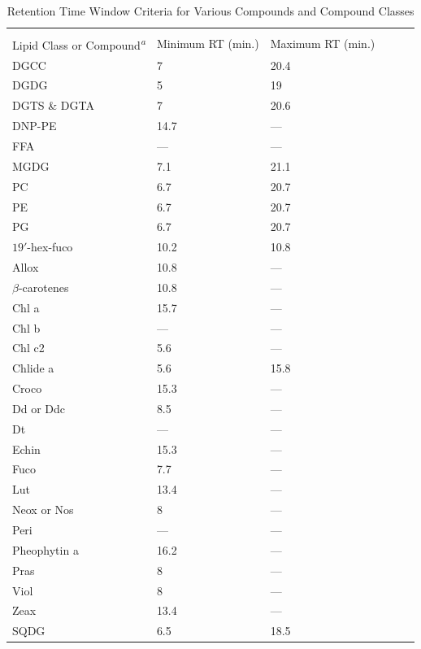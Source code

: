 \clearpage

\begin{normalsize}
\begin{singlespace}
\begin{flushleft}
\begin{longtable}{ Lp{.45\linewidth} Lp{.25\linewidth} Lp{.25\linewidth}}
\caption[Retention Time Window Criteria for Various Compounds and Compound Classes]{Retention Time Window Criteria for Various Compounds and Compound Classes}\\
\label{table:adn4}
\endfirsthead
\endhead
\toprule
Lipid Class or Compound\emph{\textsuperscript{a}} & Minimum RT (min.) & Maximum RT (min.) \\
\midrule
DGCC & 7 & 20.4 \\
DGDG & 5 & 19 \\
DGTS \& DGTA & 7 & 20.6 \\
DNP-PE & 14.7 & --- \\
FFA & --- & --- \\
MGDG & 7.1 & 21.1 \\
PC & 6.7 & 20.7 \\
PE & 6.7 & 20.7 \\
PG & 6.7 & 20.7 \\
$19'$-hex-fuco & 10.2 & 10.8 \\
Allox & 10.8 & --- \\
$\beta$-carotenes & 10.8 & --- \\
Chl a & 15.7 & --- \\
Chl b & --- & --- \\
Chl c2 & 5.6 & --- \\
Chlide a & 5.6 & 15.8 \\
Croco & 15.3 & --- \\
Dd or Ddc & 8.5 & --- \\
Dt & --- & --- \\
Echin & 15.3 & --- \\
Fuco & 7.7 & --- \\
Lut & 13.4 & --- \\
Neox or Nos & 8 & --- \\
Peri & --- & --- \\
Pheophytin a & 16.2 & --- \\
Pras & 8 & --- \\
Viol & 8 & --- \\
Zeax & 13.4 & --- \\
SQDG & 6.5 & 18.5 \\

\end{longtable}
\end{flushleft}
\end{singlespace}
\end{normalsize}
